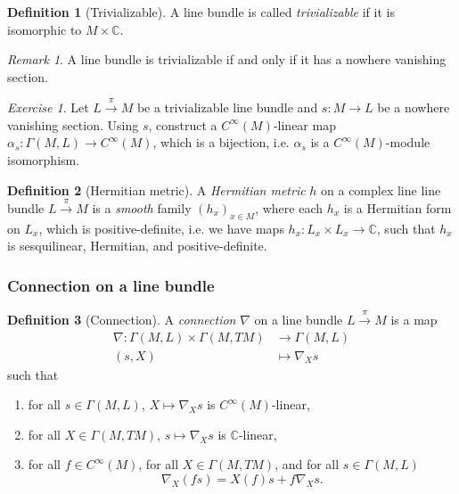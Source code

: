 \documentclass[11pt]{amsart}
\numberwithin{equation}{section}
\theoremstyle{plain}
\theoremstyle{definition}
\newtheorem{defn}{Definition}[subsection]
\theoremstyle{remark}
\newtheorem{rem}{Remark}[subsection]
\newtheorem{exe}{Exercise}[subsection]
\begin{document}
\begin{defn}[Trivializable]
A line bundle is called \emph{trivializable} if it is isomorphic to $M\times\mathbb{C}$.
\end{defn}

\begin{rem}
A line bundle is trivializable if and only if it has a nowhere vanishing section.
\end{rem}

\begin{exe}
Let $L\xrightarrow{\pi}M$ be a trivializable line bundle and $s\colon M\to L$ be a nowhere vanishing section. Using $s$, construct a $C^\infty(M)$-linear map $\alpha_s\colon \Gamma(M,L)\to C^\infty(M)$, which is a bijection, i.e. $\alpha_s$ is a $C^\infty(M)$-module isomorphism.
\end{exe}

\begin{defn}[Hermitian metric]
A \emph{Hermitian metric} $h$ on a complex line line bundle $L\xrightarrow{\pi}M$ is a \emph{smooth} family $(h_x)_{x\in M}$, where each $h_x$ is a Hermitian form on $L_x$, which is positive-definite, i.e. we have maps $h_x\colon L_x\times L_x\to \mathbb{C}$, such that $h_x$ is sesquilinear, Hermitian, and positive-definite.
\end{defn}


\subsubsection{Connection on a line bundle}



\begin{defn}[Connection]
A \emph{connection} $\nabla$ on a line bundle $L\xrightarrow{\pi}M$ is a map 
\begin{align*}
\nabla\colon \Gamma(M,L)\times \Gamma(M,TM)&\to \Gamma(M,L)\\
(s,X)&\mapsto \nabla_Xs
\end{align*}
such that
\begin{enumerate}[$(i)$]
\item{for all $s\in \Gamma(M,L)$, $X\mapsto \nabla_Xs$ is $C^\infty(M)$-linear,}
\item{for all $X\in \Gamma(M,TM)$, $s\mapsto \nabla_Xs$ is $\mathbb{C}$-linear,}
\item{for all $f\in C^\infty(M)$, for all $X\in\Gamma(M,TM)$, and for all $s\in\Gamma(M,L)$
$$\nabla_X(fs)=X(f)s+f\nabla_Xs.$$
}
\end{enumerate}
\end{defn}
\end{document}
